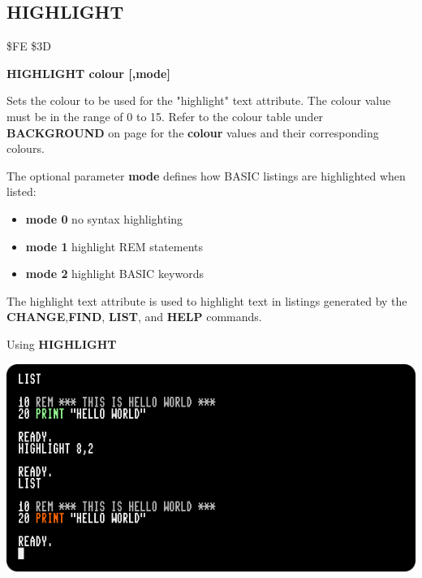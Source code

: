 
\newpage
\subsection{HIGHLIGHT}
\begin{description}[leftmargin=2cm,style=nextline]
\item [Token:] \$FE \$3D
\item [Format:] {\bf HIGHLIGHT colour [,mode]}
\item [Usage:] Sets the colour
               to be used for the "highlight" text attribute.
               The colour value must be in the
               range of 0 to 15. Refer to the colour table under {\bf BACKGROUND} on page \pageref{colourtable}
               for the {\bf colour} values and their corresponding colours.

               The optional parameter {\bf mode} defines how
               BASIC listings are highlighted when listed:

               \begin{itemize}
                 \item {\bf mode 0} no syntax highlighting
                 \item {\bf mode 1} highlight REM statements
                 \item {\bf mode 2} highlight BASIC keywords
               \end{itemize}

\item [Remarks:] The highlight text attribute is used to highlight text
               in listings generated by the {\bf CHANGE},{\bf FIND},
               {\bf LIST}, and {\bf HELP} commands.
\item [Example:] Using {\bf HIGHLIGHT}
\item \begin{center}\includegraphics[width=0.8\linewidth]{images/highlight-example.png}\end{center}
\end{description}

